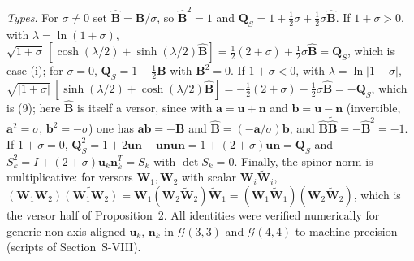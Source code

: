 \documentclass[journal]{IEEEtran}
\newcommand{\rev}[1]{\widetilde{#1}}
\begin{document}
\emph{Types.} For $\sigma\neq0$ set $\hat{\bm{B}}=\bm{B}/\sigma$, so
$\hat{\bm{B}}^2=1$ and $\bm{Q}_S=1+\tfrac12\sigma+\tfrac12\sigma\hat{\bm{B}}$.
If $1+\sigma>0$, with $\lambda=\ln(1+\sigma)$,
$\sqrt{1+\sigma}\,[\cosh(\lambda/2)+\sinh(\lambda/2)\hat{\bm{B}}]
=\tfrac12(2+\sigma)+\tfrac12\sigma\hat{\bm{B}}=\bm{Q}_S$, which is case (i);
for $\sigma=0$, $\bm{Q}_S=1+\tfrac12\bm{B}$ with $\bm{B}^2=0$. If
$1+\sigma<0$, with $\lambda=\ln\lvert1+\sigma\rvert$,
$\sqrt{\lvert1+\sigma\rvert}\,[\sinh(\lambda/2)+\cosh(\lambda/2)\hat{\bm{B}}]
=-\tfrac12(2+\sigma)-\tfrac12\sigma\hat{\bm{B}}=-\bm{Q}_S$, which is
(9); here $\hat{\bm{B}}$ is itself a versor, since with
$\bm{a}=\bm{u}+\bm{n}$ and $\bm{b}=\bm{u}-\bm{n}$ (invertible, $\bm{a}^2=\sigma$,
$\bm{b}^2=-\sigma$) one has $\bm{a}\bm{b}=-\bm{B}$ and
$\hat{\bm{B}}=(-\bm{a}/\sigma)\bm{b}$, and
$\hat{\bm{B}}\rev{\hat{\bm{B}}}=-\hat{\bm{B}}^2=-1$. If $1+\sigma=0$,
$\bm{Q}_S^2=1+2\bm{u}\bm{n}+\bm{u}\bm{n}\bm{u}\bm{n}=1+(2+\sigma)\bm{u}\bm{n}
=\bm{Q}_S$ and $S_k^2=I+(2+\sigma)\bm{u}_k\bm{n}_k^{T}=S_k$ with $\det S_k=0$.
Finally, the spinor norm is multiplicative: for versors $\bm{W}_1,\bm{W}_2$
with scalar $\bm{W}_i\rev{\bm{W}}_i$,
$(\bm{W}_1\bm{W}_2)\rev{(\bm{W}_1\bm{W}_2)}=\bm{W}_1(\bm{W}_2\rev{\bm{W}}_2)\rev{\bm{W}}_1
=(\bm{W}_1\rev{\bm{W}}_1)(\bm{W}_2\rev{\bm{W}}_2)$, which is the versor half
of Proposition~2. All identities were verified numerically
for generic non-axis-aligned $\bm{u}_k$, $\bm{n}_k$ in $\mathcal{G}(3,3)$ and
$\mathcal{G}(4,4)$ to machine precision (scripts of Section~S-VIII).
\end{document}
